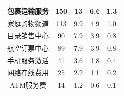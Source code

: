 \begin{table}[]
\begin{tabular}{|c|c|ccc|}
    包裹运输服务                & 150                                                                                  & \multicolumn{1}{c|}{13}                                                       & \multicolumn{1}{c|}{6.6}                                                        & 1.3                                                      \\ \hline
    家庭购物频道                & 113                                                                                  & \multicolumn{1}{c|}{9.9}                                                      & \multicolumn{1}{c|}{4.9}                                                        & 1.0                                                      \\ \hline
    目录销售中心                & 90                                                                                   & \multicolumn{1}{c|}{7.9}                                                      & \multicolumn{1}{c|}{3.9}                                                        & 0.8                                                      \\ \hline
    航空订票中心                & 89                                                                                   & \multicolumn{1}{c|}{7.9}                                                      & \multicolumn{1}{c|}{3.9}                                                        & 0.8                                                      \\ \hline
    手机服务激活                & 41                                                                                   & \multicolumn{1}{c|}{3.6}                                                      & \multicolumn{1}{c|}{1.8}                                                        & 0.4                                                      \\ \hline
    网络在线费用                & 25                                                                                   & \multicolumn{1}{c|}{2.2}                                                      & \multicolumn{1}{c|}{1.1}                                                        & 0.2                                                      \\ \hline
    ATM服务费                & 14                                                                                   & \multicolumn{1}{c|}{1.2}                                                      & \multicolumn{1}{c|}{0.6}                                                        & 0.1                                                      \\ \hline
    \end{tabular}
\end{table}

